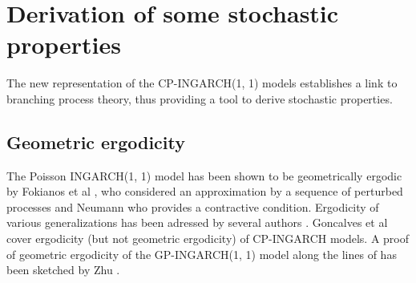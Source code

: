 \documentclass[review]{elsarticle}
\begin{document}
\section{Derivation of some stochastic properties}

The new representation of the CP-INGARCH(1, 1) models establishes a link to branching process theory, thus providing a tool to derive stochastic properties.

\subsection{Geometric ergodicity}

The Poisson INGARCH(1, 1) model has been shown to be geometrically ergodic by Fokianos et al \cite{Fokianos2009}, who considered an approximation by a sequence of perturbed processes and Neumann \cite{Neumann2011} who provides a contractive condition. Ergodicity of various generalizations has been adressed by several authors \citep{Davis2016, Douc2013, Neumann2011}. Goncalves et al \citep{Goncalves2015} cover ergodicity (but not geometric ergodicity) of CP-INGARCH models. A proof of geometric ergodicity of the GP-INGARCH(1, 1) model along the lines of \cite{Neumann2011} has been sketched by Zhu \citep{Zhu2012}. %
\end{document}
